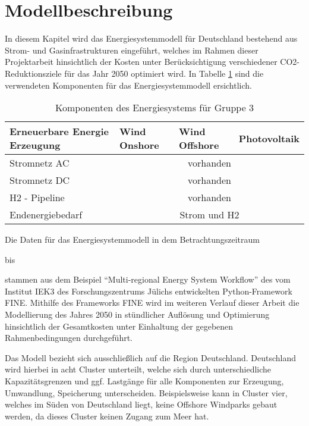 \section{Modellbeschreibung}
\label{chap:modellbeschreibung}
In diesem Kapitel wird das Energiesystemmodell für Deutschland bestehend aus Strom- und Gasinfrastrukturen eingeführt, welches im Rahmen dieser Projektarbeit hinsichtlich der Kosten unter Berücksichtigung verschiedener CO2-Reduktionsziele für das Jahr 2050 optimiert wird. In Tabelle \ref{tab:systemdesign2} sind die verwendeten Komponenten für das Energiesystemmodell ersichtlich.

\begin{table}[ht!]
    \begin{tabular}{|lcll|}
        \hline
        \multicolumn{1}{|l|}{Erneuerbare Energie Erzeugung} & \multicolumn{1}{l|}{Wind Onshore} & \multicolumn{1}{l|}{Wind Offshore} & Photovoltaik \\ \hline
        \multicolumn{1}{|l|}{Stromnetz AC}     & \multicolumn{3}{c|}{vorhanden}                \\ \hline
        \multicolumn{1}{|l|}{Stromnetz DC}     & \multicolumn{3}{c|}{vorhanden}                \\ \hline
        \multicolumn{1}{|l|}{H2 - Pipeline}    & \multicolumn{3}{c|}{vorhanden}                \\ \hline
        \multicolumn{1}{|l|}{Endenergiebedarf} & \multicolumn{3}{c|}{Strom und H2} \\ \hline
    \end{tabular}
    \caption{Komponenten des Energiesystems für Gruppe 3}
    \label{tab:systemdesign2}
\end{table}

Die Daten für das Energiesystemmodell in dem Betrachtungszeitraum \date{01.01.2050} bis \date{31.12.2050} stammen aus dem Beispiel ``Multi-regional Energy System Workflow'' des vom Institut IEK3 des Forschungszentrums Jülichs entwickelten Python-Framework FINE. 
Mithilfe des Frameworks FINE wird im weiteren Verlauf dieser Arbeit die Modellierung des Jahres 2050 in stündlicher Auflösung und Optimierung hinsichtlich der Gesamtkosten unter Einhaltung der gegebenen Rahmenbedingungen durchgeführt.

Das Modell bezieht sich ausschließlich auf die Region Deutschland.  Deutschland wird hierbei in acht Cluster unterteilt, welche sich durch unterschiedliche Kapazitätsgrenzen und ggf. Lastgänge für alle Komponenten zur Erzeugung, Umwandlung, Speicherung unterscheiden. Beispielsweise kann in Cluster vier, welches im Süden von Deutschland liegt, keine Offshore Windparks gebaut werden, da dieses Cluster keinen Zugang zum Meer hat. 

